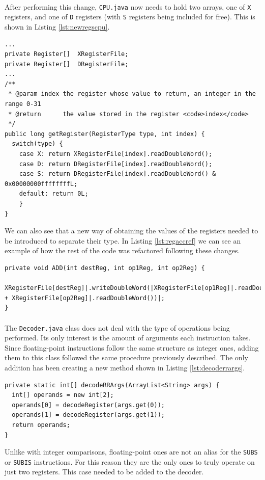 \paragraph{}
After performing this change, \verb|CPU.java| now needs to hold two arrays, one of \verb|X| registers, and one of \verb|D| registers (with \verb|S| registers being included for free). This is shown in Listing \ref{lst:newregscpu}.
\begin{lstlisting}[float, caption={The new registers}, label={lst:newregscpu}]
...
private Register[]	XRegisterFile;
private Register[]	DRegisterFile;
...
/**
 * @param index	the register whose value to return, an integer in the range 0-31
 * @return		the value stored in the register <code>index</code>
 */
public long getRegister(RegisterType type, int index) {
  switch(type) {
    case X: return XRegisterFile[index].readDoubleWord();
    case D: return DRegisterFile[index].readDoubleWord();
    case S: return DRegisterFile[index].readDoubleWord() & 0x00000000ffffffffL;
    default: return 0L;
    }
}
\end{lstlisting}
We can also see that a new way of obtaining the values of the registers needed to be introduced to separate their type. In Listing \ref{lst:regaccref} we can see an example of how the rest of the code was refactored following these changes.
\begin{lstlisting}[float, caption={The refactored register access}, label={lst:regaccref}]
private void ADD(int destReg, int op1Reg, int op2Reg) {
  XRegisterFile[destReg]|.writeDoubleWord(|XRegisterFile[op1Reg]|.readDoubleWord()| + XRegisterFile[op2Reg]|.readDoubleWord())|;
}
\end{lstlisting}
\paragraph{}
The \verb|Decoder.java| class does not deal with the type of operations being performed. Its only interest is the amount of arguments each instruction takes. Since floating-point instructions follow the same structure as integer ones, adding them to this class followed the same procedure previously described. The only addition has been creating a new method shown in Listing \ref{lst:decoderrargs}.
\begin{lstlisting}[float, caption={New decoder for floating-point comparisons}, label={lst:decoderrargs}]
private static int[] decodeRRArgs(ArrayList<String> args) {
  int[] operands = new int[2];
  operands[0] = decodeRegister(args.get(0));
  operands[1] = decodeRegister(args.get(1));
  return operands;
}
\end{lstlisting}
Unlike with integer comparisons, floating-point ones are not an alias for the \verb|SUBS| or \verb|SUBIS| instructions. For this reason they are the only ones to truly operate on just two registers. This case needed to be added to the decoder.
